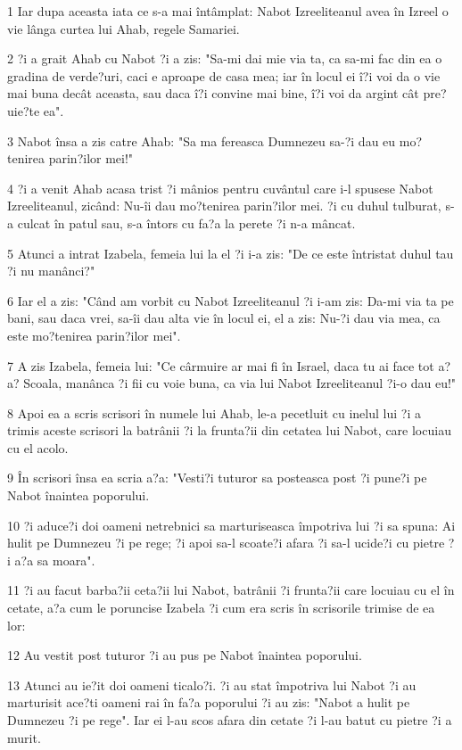 \par 1 Iar dupa aceasta iata ce s-a mai întâmplat: Nabot Izreeliteanul avea în Izreel o vie lânga curtea lui Ahab, regele Samariei.
\par 2 ?i a grait Ahab cu Nabot ?i a zis: "Sa-mi dai mie via ta, ca sa-mi fac din ea o gradina de verde?uri, caci e aproape de casa mea; iar în locul ei î?i voi da o vie mai buna decât aceasta, sau daca î?i convine mai bine, î?i voi da argint cât pre?uie?te ea".
\par 3 Nabot însa a zis catre Ahab: "Sa ma fereasca Dumnezeu sa-?i dau eu mo?tenirea parin?ilor mei!"
\par 4 ?i a venit Ahab acasa trist ?i mânios pentru cuvântul care i-l spusese Nabot Izreeliteanul, zicând: Nu-îi dau mo?tenirea parin?ilor mei. ?i cu duhul tulburat, s-a culcat în patul sau, s-a întors cu fa?a la perete ?i n-a mâncat.
\par 5 Atunci a intrat Izabela, femeia lui la el ?i i-a zis: "De ce este întristat duhul tau ?i nu manânci?"
\par 6 Iar el a zis: "Când am vorbit cu Nabot Izreeliteanul ?i i-am zis: Da-mi via ta pe bani, sau daca vrei, sa-îi dau alta vie în locul ei, el a zis: Nu-?i dau via mea, ca este mo?tenirea parin?ilor mei".
\par 7 A zis Izabela, femeia lui: "Ce cârmuire ar mai fi în Israel, daca tu ai face tot a?a? Scoala, manânca ?i fii cu voie buna, ca via lui Nabot Izreeliteanul ?i-o dau eu!"
\par 8 Apoi ea a scris scrisori în numele lui Ahab, le-a pecetluit cu inelul lui ?i a trimis aceste scrisori la batrânii ?i la frunta?ii din cetatea lui Nabot, care locuiau cu el acolo.
\par 9 În scrisori însa ea scria a?a: "Vesti?i tuturor sa posteasca post ?i pune?i pe Nabot înaintea poporului.
\par 10 ?i aduce?i doi oameni netrebnici sa marturiseasca împotriva lui ?i sa spuna: Ai hulit pe Dumnezeu ?i pe rege; ?i apoi sa-l scoate?i afara ?i sa-l ucide?i cu pietre ?i a?a sa moara".
\par 11 ?i au facut barba?ii ceta?ii lui Nabot, batrânii ?i frunta?ii care locuiau cu el în cetate, a?a cum le poruncise Izabela ?i cum era scris în scrisorile trimise de ea lor:
\par 12 Au vestit post tuturor ?i au pus pe Nabot înaintea poporului.
\par 13 Atunci au ie?it doi oameni ticalo?i. ?i au stat împotriva lui Nabot ?i au marturisit ace?ti oameni rai în fa?a poporului ?i au zis: "Nabot a hulit pe Dumnezeu ?i pe rege". Iar ei l-au scos afara din cetate ?i l-au batut cu pietre ?i a murit.
